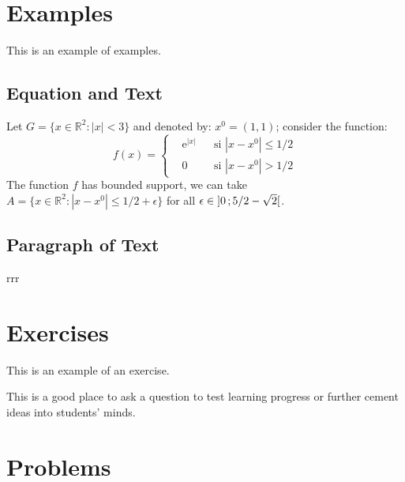 \documentclass[11pt,twoside]{book} %
\begin{document}
\section{Examples}

This is an example of examples.

\subsection{Equation and Text}

\begin{example}
    Let $G=\{x\in\mathbb{R}^2:|x|<3\}$ and denoted by: $x^0=(1,1)$; consider the function:
    \begin{equation}
        f(x)=\left\{\begin{aligned}& \mathrm{e}^{|x|} &  & \text{si $|x-x^0|\leq 1/2$} \\ & 0  &  & \text{si $|x-x^0|> 1/2$}\end{aligned}\right.
    \end{equation}
    The function $f$ has bounded support, we can take $A=\{x\in\mathbb{R}^2:|x-x^0|\leq 1/2+\epsilon\}$ for all $\epsilon\in\mathopen{]}0\,;5/2-\sqrt{2}\mathclose{[}$.
\end{example}

\subsection{Paragraph of Text}

\begin{example}
    rrr
\end{example}


\section{Exercises}

This is an example of an exercise.

\begin{exercise}
    This is a good place to ask a question to test learning progress or further cement ideas into students' minds.
\end{exercise}


\section{Problems}
\end{document}
